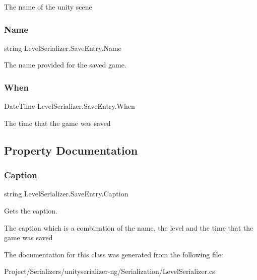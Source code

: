The name of the unity scene 

\mbox{\label{class_level_serializer_1_1_save_entry_ad83ac6d066dcdf4cbea45c5127105034}} 
\subsubsection{\texorpdfstring{Name}{Name}}
{\footnotesize\ttfamily string Level\+Serializer.\+Save\+Entry.\+Name}



The name provided for the saved game. 

\mbox{\label{class_level_serializer_1_1_save_entry_a9ea96ed3de57218ff1ca5c4fbfc02c49}} 
\subsubsection{\texorpdfstring{When}{When}}
{\footnotesize\ttfamily Date\+Time Level\+Serializer.\+Save\+Entry.\+When}



The time that the game was saved 



\subsection{Property Documentation}
\mbox{\label{class_level_serializer_1_1_save_entry_a0a41b3b1fd07cf3eddc2262ee569a7e5}} 
\subsubsection{\texorpdfstring{Caption}{Caption}}
{\footnotesize\ttfamily string Level\+Serializer.\+Save\+Entry.\+Caption\hspace{0.3cm}{\ttfamily [get]}}



Gets the caption. 

The caption which is a combination of the name, the level and the time that the game was saved 

The documentation for this class was generated from the following file\+:\begin{DoxyCompactItemize}
\item 
Project/\+Serializers/unityserializer-\/ng/\+Serialization/Level\+Serializer.\+cs\end{DoxyCompactItemize}
